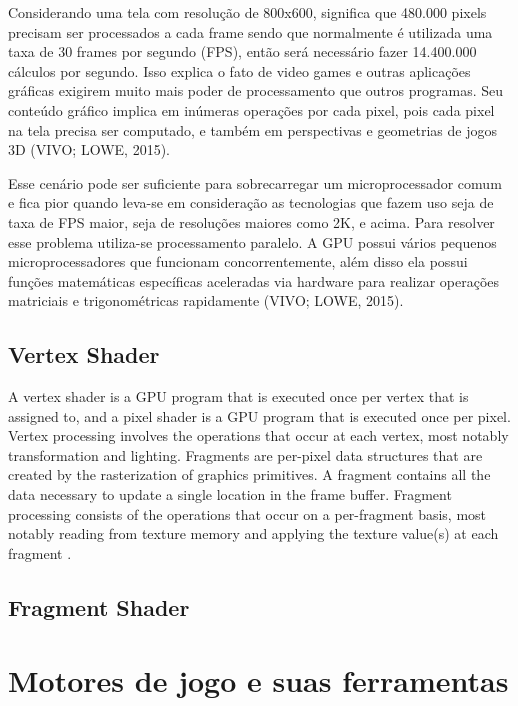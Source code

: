 Considerando uma tela com resolução de 800x600, significa que 480.000 pixels precisam ser processados a cada frame sendo que normalmente é utilizada uma taxa de 30 frames por segundo (\acrshort{FPS}), então será necessário fazer 14.400.000 cálculos por segundo. Isso explica o fato de video games e outras aplicações gráficas exigirem muito mais poder de processamento que outros programas. Seu conteúdo gráfico implica em inúmeras operações por cada pixel, pois cada pixel na tela precisa ser computado, e também em perspectivas e geometrias de jogos 3D (VIVO; LOWE, 2015)\nocite{bookOfShaders}.  

Esse cenário pode ser suficiente para sobrecarregar um microprocessador comum e fica pior quando leva-se em consideração as tecnologias que fazem uso seja de taxa de FPS maior, seja de resoluções maiores como 2K, e acima. Para resolver esse problema utiliza-se processamento paralelo. A GPU possui vários pequenos microprocessadores que funcionam concorrentemente, além disso ela possui funções matemáticas específicas aceleradas via hardware para realizar operações matriciais e trigonométricas rapidamente (VIVO; LOWE, 2015)\nocite{bookOfShaders}.


\subsection{Vertex Shader}

A vertex shader is a GPU program that is executed once per vertex that is assigned to, and a pixel shader is a GPU program that is executed once per pixel.
Vertex processing involves the operations that occur at each vertex, most notably transformation and lighting. Fragments are per-pixel data structures that are created by the rasterization of graphics primitives. A fragment contains all the data necessary to update a single location in the frame buffer. Fragment processing consists of the operations that occur on a per-fragment basis, most notably reading from texture memory and applying the texture value(s) at each fragment \cite{GLSLBook}.

\subsection{Fragment Shader}

\section{Motores de jogo e suas ferramentas}
\label{sec:motores-jogo-ferramentas}

